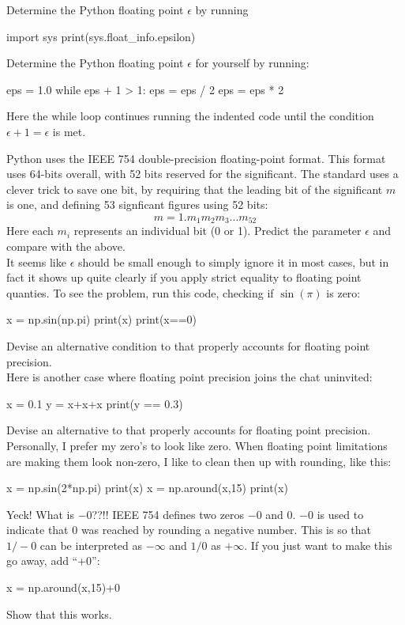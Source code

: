 \plot Determine the Python floating point $\epsilon$ by running
\begin{python}
import sys
print(sys.float_info.epsilon)
\end{python}

\vskip 0.25cm
\begin{plot} \end{plot} Determine the Python floating point $\epsilon$ for yourself by running:
\begin{python}
eps = 1.0
while eps + 1 > 1:
    eps = eps / 2
eps = eps * 2
\end{python}
Here the while loop continues running the indented code until the
condition $\epsilon+1=\epsilon$ is met.

\newpage
\vskip 0.25cm
\plot Python uses the IEEE 754 double-precision
floating-point format.  This format uses 64-bits overall, with 52 bits
reserved for the significant.  The standard uses a clever trick to
save one bit, by requiring that the leading bit of the significant $m$ is
one, and defining 53 signficant figures using 52 bits:
\begin{displaymath}
m = 1.m_1 m_2 m_3 ... m_{52}
\end{displaymath}
Here each $m_i$ represents an individual bit (0 or 1).  Predict the
parameter $\epsilon$ and compare with the above. \\


\plot It seems like $\epsilon$ should be small enough to simply ignore
it in most cases, but in fact it shows up quite clearly if you apply
strict equality to floating point quanties.  To see the problem, run
this code, checking if $\sin(\pi)$ is zero:
\begin{python}
x = np.sin(np.pi)
print(x)
print(x==0)
\end{python}
Devise an alternative condition to  that properly accounts for
floating point precision.\\

\plot Here is another case where floating point precision joins the chat uninvited:
\begin{python}
x = 0.1
y = x+x+x
print(y == 0.3)
\end{python}
Devise an alternative to  that properly accounts for
floating point precision.\\

\plot Personally, I prefer my zero's to look like zero.  When floating
point limitations are making them look non-zero, I like to clean then
up with rounding, like this:
\begin{python}
x = np.sin(2*np.pi)
print(x)
x = np.around(x,15)
print(x)
\end{python}
Yeck! What is $-0$??!!  IEEE 754 defines two zeros $-0$ and $0$.  $-0$
is used to indicate that $0$ was reached by rounding a negative
number.  This is so that $1/-0$ can be interpreted as $-\infty$ and
$1/0$ as $+\infty$.  If you just want to make this go away, add ``+0'':
\begin{python}
x = np.around(x,15)+0
\end{python}
Show that this works.\\

